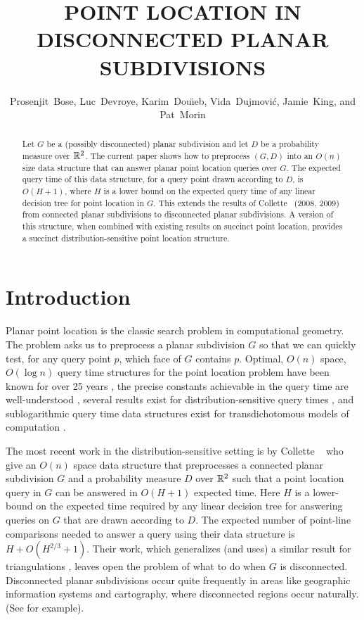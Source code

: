 \documentclass{patmorin}
\title{\MakeUppercase{Point Location in Disconnected Planar Subdivisions}}
\author{Prosenjit~Bose, 
        Luc~Devroye,
	Karim~Dou\"{\i}eb, 
	Vida~Dujmovi\'c, 
	Jamie~King, and 
	Pat~Morin}
\begin{document}
\maketitle

\begin{abstract}
Let $G$ be a (possibly disconnected) planar subdivision and let $D$
be a probability measure over $\mathbb{R}^2$.  The current paper shows how to
preprocess $(G,D)$ into an $O(n)$ size data structure that can answer
planar point location queries over $G$.  The expected query time of this
data structure, for a query point drawn according to $D$, is $O(H+1)$,
where $H$ is a lower bound on the expected query time of any linear
decision tree for point location in $G$.  This extends the results
of Collette \etal\ (2008, 2009) from connected planar subdivisions to
disconnected planar subdivisions.  A version of this structure, when
combined with existing results on succinct point location, provides a
succinct distribution-sensitive point location structure.
\end{abstract}

\section{Introduction}

Planar point location is the classic search problem in computational
geometry.  The problem asks us to preprocess a planar subdivision
$G$ so that we can quickly test, for any query point $p$, which
face of $G$ contains $p$.  Optimal, $O(n)$ space, $O(\log n)$ query
time structures for the point location problem have been known for
over 25 years \cite{egs86,k83,m90,st86}, the precise constants
achievable in the query time are well-understood \cite{as98},
several results exist for distribution-sensitive query times
\cite{acmr00,amm00,amm01a,amm01b,ammw07,cdilm08,cdilm09,i01,i04}, and
sublogarithmic query time data structures exist for transdichotomous
models of computation \cite{c06,cp09,p06}.

The most recent work in the distribution-sensitive setting is by
Collette \etal\ \cite{cdilm08} who give an $O(n)$ space data structure
that preprocesses a connected planar subdivision $G$ and a probability
measure $D$ over $\mathbb{R}^2$ such that a point location query in $G$ can be
answered in $O(H+1)$ expected time.  Here $H$ is a lower-bound on the
expected time required by any linear decision tree for answering queries
on $G$ that are drawn according to $D$.  The expected number of point-line
comparisons needed to answer a query using their data structure is $H +
O(H^{2/3}+1)$.  Their work, which generalizes (and uses) a similar result
for triangulations \cite{ammw07}, leaves open the problem of what to do
when $G$ is disconnected. Disconnected planar subdivisions occur quite
frequently in areas like geographic information systems and cartography,
where disconnected regions occur naturally. (See 
for example).
\end{document}
